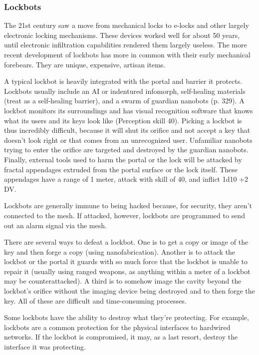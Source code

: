 \subsubsection{Lockbots} 

The 21st century saw a move from mechanical locks to e-locks and other largely electronic locking mechanisms. These devices worked well for about 50 years, until electronic infiltration capabilities rendered them largely useless. The more recent development of lockbots has more in common with their early mechanical forebears. They are unique, expensive, artisan items. 

A typical lockbot is heavily integrated with the portal and barrier it protects. Lockbots usually include an AI or indentured infomorph, self-healing materials (treat as a self-healing barrier), and a swarm of guardian nanobots (p. 329). A lockbot monitors its surroundings and has visual recognition software that knows what its users and its keys look like (Perception skill 40). Picking a lockbot is thus incredibly difficult, because it will shut its orifice and not accept a key that doesn't look right or that comes from an unrecognized user. Unfamiliar nanobots trying to enter the orifice are targeted and destroyed by the guardian nanobots. Finally, external tools used to harm the portal or the lock will be attacked by fractal appendages extruded from the portal surface or the lock itself. These appendages have a range of 1 meter, attack with skill of 40, and inflict 1d10 +2 DV. 

Lockbots are generally immune to being hacked because, for security, they aren't connected to the mesh. If attacked, however, lockbots are programmed to send out an alarm signal via the mesh. 

There are several ways to defeat a lockbot. One is to get a copy or image of the key and then forge a copy (using nanofabrication). Another is to attack the lockbot or the portal it guards with so much force that the lockbot is unable to repair it (usually using ranged weapons, as anything within a meter of a lockbot may be counterattacked). A third is to somehow image the cavity beyond the lockbot's orifice without the imaging device being destroyed and to then forge the key. All of these are difficult and time-consuming processes. 

Some lockbots have the ability to destroy what they're protecting. For example, lockbots are a common protection for the physical interfaces to hardwired networks. If the lockbot is compromised, it may, as a last resort, destroy the interface it was protecting. 

